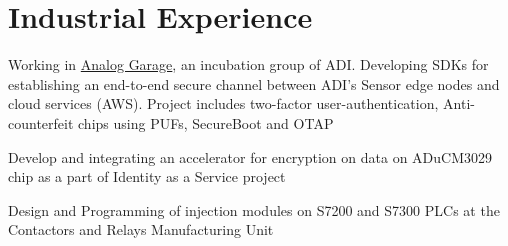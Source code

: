 \documentclass[]{deedy_format_Anmol}
\begin{document}
\hfill
\begin{minipage}[t]{0.66\textwidth} 
%
%



\section{Industrial Experience}
\vspace{0.5mm} %

\vspace{\topsep} %
\vspace{1mm}
\justify
\begin{tightemize}
\item Working in \href{https://garage.web.analog.com/}{Analog Garage}, an incubation group of ADI. Developing SDKs for establishing an end-to-end secure channel between ADI's Sensor edge nodes and cloud services (AWS). Project includes two-factor user-authentication, Anti-counterfeit chips using PUFs, SecureBoot and OTAP
\end{tightemize}
\vspace{\topsep}
\sectionsep


\vspace{1mm}
\justify
\begin{tightemize}
\item Develop and integrating an accelerator for encryption on data on ADuCM3029 chip as a part of Identity as a Service project
\end{tightemize}
\vspace{\topsep}
\sectionsep

\vspace{1mm}
\justify
\begin{tightemize}
\item Design and Programming of injection modules on S7200 and S7300 PLCs at the Contactors and Relays Manufacturing Unit
\end{tightemize}
\vspace{\topsep}
\sectionsep


\end{minipage}
\end{document}
